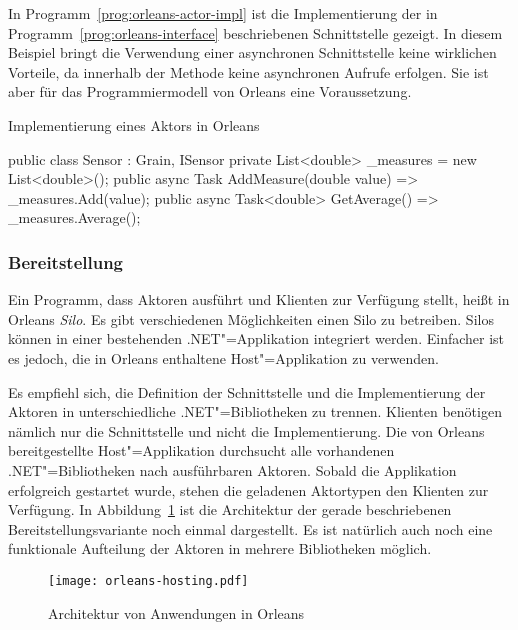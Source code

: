 In Programm~\ref{prog:orleans-actor-impl} ist die Implementierung der in Programm~\ref{prog:orleans-interface} beschriebenen Schnittstelle gezeigt. In diesem Beispiel bringt die Verwendung einer asynchronen Schnittstelle keine wirklichen Vorteile, da innerhalb der Methode keine asynchronen Aufrufe erfolgen. Sie ist aber für das Programmiermodell von Orleans eine Voraussetzung.

\begin{program}[!hbt]
\caption{Implementierung eines Aktors in Orleans}
\label{prog:orleans-actor-impl}
\begin{CsCode}
public class Sensor : Grain, ISensor {
	private List<double> _measures = new List<double>();
	public async Task AddMeasure(double value) => _measures.Add(value);
	public async Task<double> GetAverage() => _measures.Average();
}
\end{CsCode}
\end{program}

\subsubsection{Bereitstellung}

Ein Programm, dass Aktoren ausführt und Klienten zur Verfügung stellt, heißt in Orleans \textit{Silo}. Es gibt verschiedenen Möglichkeiten einen Silo zu betreiben. Silos können in einer bestehenden .NET"=Applikation integriert werden. Einfacher ist es jedoch, die in Orleans enthaltene Host"=Applikation zu verwenden. 

Es empfiehl sich, die Definition der Schnittstelle und die Implementierung der Aktoren in unterschiedliche .NET"=Bibliotheken zu trennen. Klienten benötigen nämlich nur die Schnittstelle und nicht die Implementierung. Die von Orleans bereitgestellte Host"=Applikation durchsucht alle vorhandenen .NET"=Bibliotheken nach ausführbaren Aktoren. Sobald die Applikation erfolgreich gestartet wurde, stehen die geladenen Aktortypen den Klienten zur Verfügung. In Abbildung~\ref{fig:orleans-arch} ist die Architektur der gerade beschriebenen Bereitstellungsvariante noch einmal dargestellt. Es ist natürlich auch noch eine funktionale Aufteilung der Aktoren in mehrere Bibliotheken möglich.

\begin{figure}[!hbt]%
\texttt{[image: orleans-hosting.pdf]}%
\caption{Architektur von Anwendungen in Orleans}%
\label{fig:orleans-arch}%
\end{figure}

